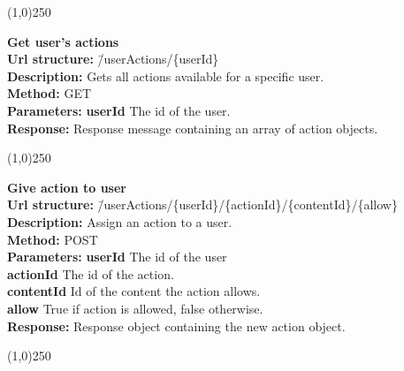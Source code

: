 \documentclass[11pt]{article}
\begin{document}
\begin{center}\line(1,0){250}\end{center}

\begin{tabbing}
\textbf{Get user's actions} \\
\textcolor{black!60}{\textbf{Url structure:}} \hspace{0.2in} \= /userActions/\{userId\} \\
\textcolor{black!60}{\textbf{Description:}}  \> Gets all actions available for a specific user. \\
\textcolor{black!60}{\textbf{Method:}} \> GET \\
\textcolor{black!60}{\textbf{Parameters:}} \> \textbf{userId} The id of the user. \\
\textcolor{black!60}{\textbf{Response:}} \> Response message containing an array of action objects.
\end{tabbing}

\begin{center}\line(1,0){250}\end{center}

\begin{tabbing}
\textbf{Give action to user} \\
\textcolor{black!60}{\textbf{Url structure:}} \hspace{0.2in} \= /userActions/\{userId\}/\{actionId\}/\{contentId\}/\{allow\} \\
\textcolor{black!60}{\textbf{Description:}}  \> Assign an action to a user. \\
\textcolor{black!60}{\textbf{Method:}} \> POST \\
\textcolor{black!60}{\textbf{Parameters:}} \> \textbf{userId} The id of the user \\
\> \textbf{actionId} The id of the action. \\
\> \textbf{contentId} Id of the content the action allows. \\
\> \textbf{allow} True if action is allowed, false otherwise. \\
\textcolor{black!60}{\textbf{Response:}} \> Response object containing the new action object.
\end{tabbing}

\begin{center}\line(1,0){250}\end{center}
\end{document}
